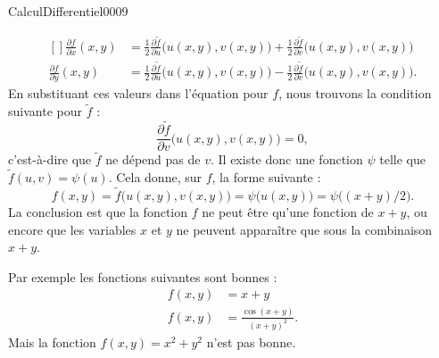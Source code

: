 \begin{corrige}{CalculDifferentiel0009}
\begin{description}
			\begin{equation}
				\begin{aligned}[]
					\frac{ \partial f }{ \partial x }(x,y)&=\frac{ 1 }{2}\frac{ \partial \tilde f }{ \partial u }\big( u(x,y),v(x,y) \big)+\frac{ 1 }{2}\frac{ \partial \tilde f }{ \partial v }\big( u(x,y),v(x,y) \big)\\
					\frac{ \partial f }{ \partial y }(x,y)&=\frac{ 1 }{2}\frac{ \partial \tilde f }{ \partial u }\big( u(x,y),v(x,y) \big)-\frac{ 1 }{2}\frac{ \partial \tilde f }{ \partial v }\big( u(x,y),v(x,y) \big).
				\end{aligned}
			\end{equation}
			En substituant ces valeurs dans l'équation pour $f$, nous trouvons la condition suivante pour $\tilde f$ :
			\begin{equation}
				\frac{ \partial \tilde f }{ \partial v }\big( u(x,y),v(x,y) \big)=0,
			\end{equation}
			c'est-à-dire que $\tilde f$ ne dépend pas de $v$. Il existe donc une fonction $\psi$ telle que $\tilde f(u,v)=\psi(u)$. Cela donne, sur $f$, la forme suivante :
			\begin{equation}
				f(x,y)=\tilde f\big( u(x,y),v(x,y) \big)=\psi\big( u(x,y) \big)=\psi\big( (x+y)/2 \big).
			\end{equation}
			La conclusion est que la fonction $f$ ne peut être qu'une fonction de $x+y$, ou encore que les variables $x$ et $y$ ne peuvent apparaître que sous la combinaison $x+y$.

			Par exemple les fonctions suivantes sont bonnes :
			\begin{subequations}
				\begin{align}
					f(x,y)&=x+y\\
					f(x,y)&=\frac{ \cos(x+y) }{ (x+y)^2 }.
				\end{align}
			\end{subequations}
			Mais la fonction $f(x,y)=x^2+y^2$ n'est pas bonne.
	\end{description}
	

\end{corrige}
